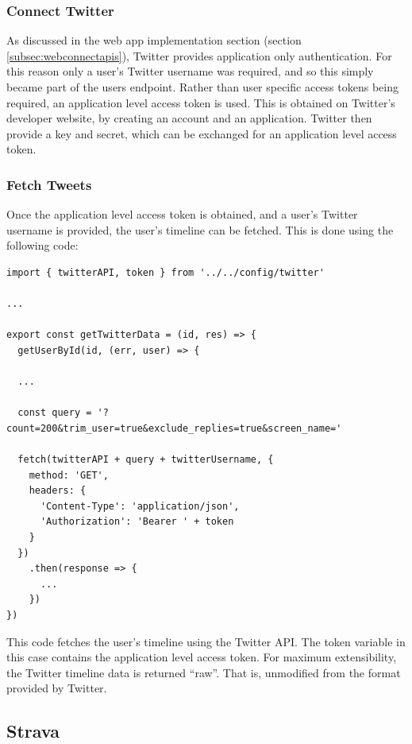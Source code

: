 \documentclass[11pt,openright,a4paper]{report}
\begin{document}
\subsubsection{Connect Twitter}
As discussed in the web app implementation section (section \ref{subsec:webconnectapis}), Twitter provides application only authentication. For this reason only a user's Twitter username was required, and so this simply became part of the users endpoint. Rather than user specific access tokens being required, an application level access token is used. This is obtained on Twitter's developer website, by creating an account and an application. Twitter then provide a key and secret, which can be exchanged for an application level access token.

\subsubsection{Fetch Tweets}
Once the application level access token is obtained, and a user's Twitter username is provided, the user's timeline can be fetched. This is done using the following code:
\begin{lstlisting}
import { twitterAPI, token } from '../../config/twitter'

...

export const getTwitterData = (id, res) => {
  getUserById(id, (err, user) => {

  ...

  const query = '?count=200&trim_user=true&exclude_replies=true&screen_name='

  fetch(twitterAPI + query + twitterUsername, {
    method: 'GET',
    headers: {
      'Content-Type': 'application/json',
      'Authorization': 'Bearer ' + token
    }
  })
    .then(response => {
      ...
    })
})
\end{lstlisting}
This code fetches the user's timeline using the Twitter API. The token variable in this case contains the application level access token. For maximum extensibility, the Twitter timeline data is returned \enquote{raw}. That is, unmodified from the format provided by Twitter.

\subsection{Strava} \label{sec:apiconnectstrava}
\end{document}
